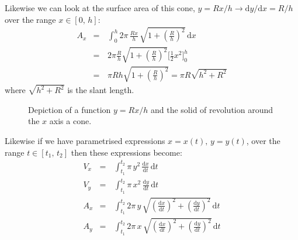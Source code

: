 \documentclass[letterpaper,10pt,english]{jupyterBook}
\begin{document}
\sphinxAtStartPar
Likewise we can look at the surface area of this cone,  \(y = R x / h \rightarrow \mathrm{d}y/\mathrm{d}x = R / h\) over the range \(x \in [0,\, h]\):
\begin{equation*}
\begin{split}A_x &=&\, \int_0^h 2\pi\,\frac{R x}{h}\,\sqrt{1 + \left(\frac{R}{h}\right)^2}\,\mathrm{d}x \\
&=&\, 2\pi \frac{R}{h}\sqrt{1 + \left(\frac{R}{h}\right)^2}\Bigg[ \frac{1}{2}x^2\Bigg]_0^h \\
&=&\, \pi R h\sqrt{1 + \left(\frac{R}{h}\right)^2} = \pi R\sqrt{h^2 + R^2}\end{split}
\end{equation*}
\sphinxAtStartPar
where \(\sqrt{h^2 + R^2}\) is the slant length.

\begin{figure}[htbp]
\centering
\capstart

\noindent{}
\caption{Depiction of a function \(y = R x / h\) and the solid of revolution around the \(x\) axis \sphinxhyphen{} a cone.}\label{\detokenize{VectorCalculus/integrationprelim:cone}}\end{figure}

\sphinxAtStartPar
Likewise if we have parametrised expressions \(x = x(t),\, y = y(t)\), over the range \(t \in [t_1,\, t_2]\) then these expressions become:
\begin{equation*}
\begin{split}V_x &=&\, \int_{t_1}^{t_2} \pi\,y^2\,\frac{\mathrm{d}x}{\mathrm{d}t}\,\mathrm{d}t \\
V_y &=&\, \int_{t_1}^{t_2} \pi\,x^2\,\frac{\mathrm{d}y}{\mathrm{d}t}\,\mathrm{d}t \\
A_x &=&\, \int_{t_1}^{t_2} 2\pi\,y\,\sqrt{\left(\frac{\mathrm{d}x}{\mathrm{d}t}\right)^2 + \left(\frac{\mathrm{d}y}{\mathrm{d}t}\right)^2}\,\mathrm{d}t \\
A_y &=&\, \int_{t_1}^{t_2} 2\pi\,x\,\sqrt{\left(\frac{\mathrm{d}x}{\mathrm{d}t}\right)^2 + \left(\frac{\mathrm{d}y}{\mathrm{d}t}\right)^2}\,\mathrm{d}t\end{split}
\end{equation*}
\end{document}
